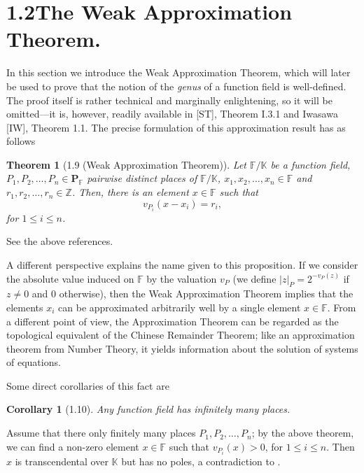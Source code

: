 \documentclass[11pt]{article}
\makeatletter
\theoremstyle{scplain}
\newtheorem*{theorem}{Theorem}
\newtheorem*{corollary}{Corollary}
\renewenvironment{proof}[1][\proofname]{%
  \par\pushQED{\qed}\normalfont\topsep6\p@\@plus6\p@\relax
  \trivlist\item[\hskip\labelsep\scshape #1\@addpunct{.}]\ignorespaces}%
  {\popQED\endtrivlist\@endpefalse}
\makeatother
\begin{document}
\section*{1.2\quad The Weak Approximation Theorem.}

\noindent
In this section we introduce the Weak Approximation Theorem, which will later be
used to prove that the notion of the \emph{genus} of a function field is
well-defined. The proof itself is rather technical and marginally enlightening,
so it will be omitted---it is, however, readily available in [ST], Theorem I.3.1
and Iwasawa [IW], Theorem 1.1. The precise formulation of this approximation
result has as follows

\begin{theorem}[1.9 (Weak Approximation Theorem)]
Let $\mathbb{F}/\mathbb{K}$ be a function field,
$P_1, P_2, \ldots, P_n \in \mathbf{P}_{\mathbb{F}}$ pairwise distinct places of
$\mathbb{F}/\mathbb{K}$, $x_1, x_2, \ldots, x_n \in \mathbb{F}$ and
$r_1, r_2, \ldots, r_n \in \mathbb{Z}$. Then, there is an element $x \in \mathbb{F}$
such that
\[
  v_{P_i}(x - x_i) = r_i,
\]
for $1 \leq i \leq n$.
\end{theorem}

\begin{proof}
See the above references.
\end{proof}

A different perspective explains the name given to this proposition. If we
consider the absolute value induced on $\mathbb{F}$ by the valuation $v_P$ (we
define $|z|_P = 2^{-v_P(z)}$ if $z \neq 0$ and $0$ otherwise), then the Weak
Approximation Theorem implies that the elements $x_i$ can be approximated
arbitrarily well by a single element $x \in \mathbb{F}$. From a different point of
view, the Approximation Theorem can be regarded as the topological equivalent of
the Chinese Remainder Theorem; like an approximation theorem from Number Theory,
it yields information about the solution of systems of equations.

Some direct corollaries of this fact are

\begin{corollary}[1.10]
Any function field has infinitely many places.
\end{corollary}

\begin{proof}
Assume that there only finitely many places $P_1, P_2, \ldots, P_n$; by the above
theorem, we can find a non-zero element $x \in \mathbb{F}$ such that
$v_{P_i}(x) > 0$, for $1 \leq i \leq n$. Then $x$ is transcendental over
$\mathbb{K}$ but has no poles, a contradiction to .
\end{proof}
\end{document}
